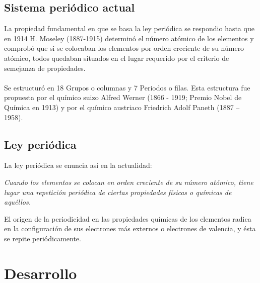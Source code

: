 \documentclass[12pt]{article}
\begin{document}
          \subsection{Sistema periódico actual}\label{sec:Sistema periódico actual}
               La propiedad fundamental en que se basa la ley periódica se respondio hasta que en 1914 H. Moseley (1887-1915) determinó el número atómico de los elementos y comprobó que si se colocaban los elementos por orden creciente de su número atómico, todos quedaban situados en el lugar requerido por el criterio de semejanza de propiedades.\\\\
               Se estructuró en 18 Grupos o columnas y 7 Periodos o filas. Esta estructura fue propuesta por el químico suizo Alfred Werner (1866 - 1919; Premio Nobel de Química en 1913) y por el químico austriaco Friedrich Adolf Paneth (1887 – 1958).
               
          \subsection{Ley periódica}\label{sec:Ley periódica}
               La ley periódica se enuncia así en la actualidad:

               \begin{center}
                    \textit{Cuando los elementos se colocan en orden creciente de su número atómico, tiene lugar una repetición periódica de ciertas propiedades físicas o químicas de aquéllos.}
               \end{center}

               El origen de la periodicidad en las propiedades químicas de los elementos radica en la configuración de sus electrones más externos o electrones de valencia, y ésta se repite periódicamente.
          
          \section{Desarrollo}\label{sec:Desarrollo}
               
\end{document}
